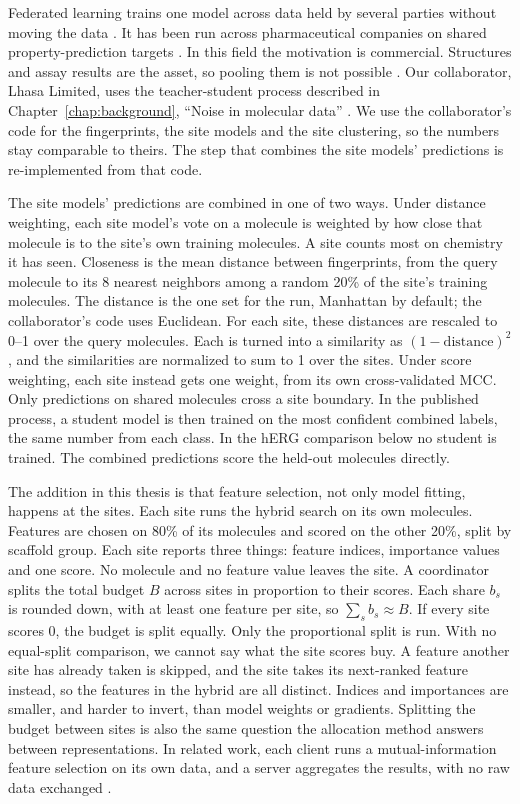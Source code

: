 Federated learning trains one model across data held by several parties without moving the data \citep{McMahan2017}. It has been run across pharmaceutical companies on shared property-prediction targets \citep{Heyndrickx2024}. In this field the motivation is commercial. Structures and assay results are the asset, so pooling them is not possible \citep{Hanser2023,Bassani2023}. Our collaborator, Lhasa Limited, uses the teacher-student process described in Chapter~\ref{chap:background}, ``Noise in molecular data'' \citep{Hanser2025}. We use the collaborator's code for the fingerprints, the site models and the site clustering, so the numbers stay comparable to theirs. The step that combines the site models' predictions is re-implemented from that code.

The site models' predictions are combined in one of two ways. Under distance weighting, each site model's vote on a molecule is weighted by how close that molecule is to the site's own training molecules. A site counts most on chemistry it has seen. Closeness is the mean distance between fingerprints, from the query molecule to its 8 nearest neighbors among a random 20\% of the site's training molecules. The distance is the one set for the run, Manhattan by default; the collaborator's code uses Euclidean. For each site, these distances are rescaled to 0--1 over the query molecules. Each is turned into a similarity as $(1 - \text{distance})^2$, and the similarities are normalized to sum to 1 over the sites. Under score weighting, each site instead gets one weight, from its own cross-validated MCC. Only predictions on shared molecules cross a site boundary. In the published process, a student model is then trained on the most confident combined labels, the same number from each class. In the hERG comparison below no student is trained. The combined predictions score the held-out molecules directly.

The addition in this thesis is that feature selection, not only model fitting, happens at the sites. Each site runs the hybrid search on its own molecules. Features are chosen on 80\% of its molecules and scored on the other 20\%, split by scaffold group. Each site reports three things: feature indices, importance values and one score. No molecule and no feature value leaves the site. A coordinator splits the total budget $B$ across sites in proportion to their scores. Each share $b_s$ is rounded down, with at least one feature per site, so $\sum_s b_s \approx B$. If every site scores 0, the budget is split equally. Only the proportional split is run. With no equal-split comparison, we cannot say what the site scores buy. A feature another site has already taken is skipped, and the site takes its next-ranked feature instead, so the features in the hybrid are all distinct. Indices and importances are smaller, and harder to invert, than model weights or gradients. Splitting the budget between sites is also the same question the allocation method answers between representations. In related work, each client runs a mutual-information feature selection on its own data, and a server aggregates the results, with no raw data exchanged \citep{Cassara2022}.

